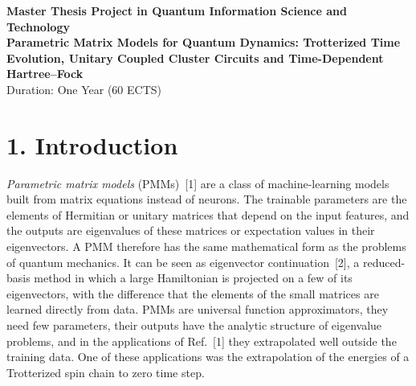 \documentclass[12pt,a4paper]{article}
\begin{document}
\begin{center}
    {\Large \textbf{Master Thesis Project in Quantum Information Science and Technology}}\\[0.3cm]
    {\large \textbf{Parametric Matrix Models for Quantum Dynamics: Trotterized Time Evolution, Unitary Coupled Cluster Circuits and Time-Dependent Hartree--Fock}}\\[0.2cm]
    \vspace{0.3cm}
    {Duration: One Year (60 ECTS)}
\end{center}

\vspace{1cm}

\section*{1. Introduction}

\emph{Parametric matrix models} (PMMs)~[1] are a class of
machine-learning models built from matrix equations instead of
neurons.  The trainable parameters are the elements of Hermitian or
unitary matrices that depend on the input features, and the outputs
are eigenvalues of these matrices or expectation values in their
eigenvectors.  A PMM therefore has the same mathematical form as the
problems of quantum mechanics.  It can be seen as eigenvector
continuation~[2], a reduced-basis method in which a large Hamiltonian
is projected on a few of its eigenvectors, with the difference that
the elements of the small matrices are learned directly from data.
PMMs are universal function approximators, they need few parameters,
their outputs have the analytic structure of eigenvalue problems, and
in the applications of Ref.~[1] they extrapolated well outside the
training data.  One of these applications was the extrapolation of the
energies of a Trotterized spin chain to zero time step.
\end{document}
